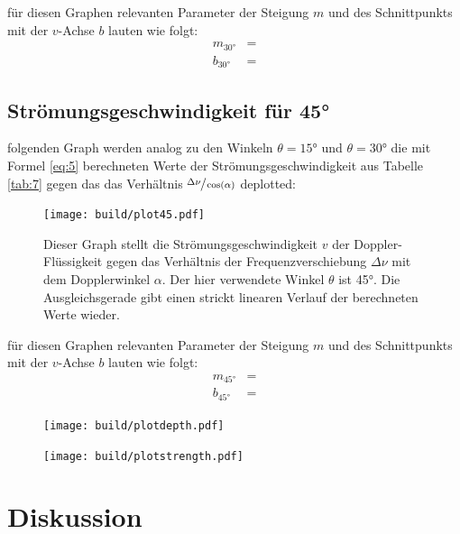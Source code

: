     \justifying für diesen Graphen relevanten Parameter der Steigung $m$ und des Schnittpunkts mit der $v$-Achse $b$ lauten wie folgt:
    \begin{align}
        m_{30°} &= \text{} \label{eq:8}\\
        b_{30°} &= \text{} \label{eq:9}
    \end{align}

\newpage
\subsection{Strömungsgeschwindigkeit für 45°}

    \justifying folgenden Graph werden analog zu den Winkeln $\theta=15°$ und $\theta=30°$ die mit Formel \eqref{eq:5} berechneten Werte der Strömungsgeschwindigkeit 
    aus Tabelle \ref{tab:7} gegen das das Verhältnis $\sfrac{\Delta\nu}{\cos(\alpha)}$ deplotted:

\begin{figure}[H]
    \centering
    \texttt{[image: build/plot45.pdf]}
    \caption{Dieser Graph stellt die Strömungsgeschwindigkeit $v$ der Doppler-Flüssigkeit gegen das Verhältnis der Frequenzverschiebung $\Delta\nu$ mit dem Dopplerwinkel $\alpha$. 
    Der hier verwendete Winkel $\theta$ ist 45°. Die Ausgleichsgerade gibt einen strickt linearen Verlauf der berechneten Werte wieder.}
    \label{fig:7}
\end{figure}

    \justifying für diesen Graphen relevanten Parameter der Steigung $m$ und des Schnittpunkts mit der $v$-Achse $b$ lauten wie folgt:
    \begin{align}
        m_{45°} &= \text{} \label{eq:10}\\
        b_{45°} &= \text{} \label{eq:11}
    \end{align}



\begin{figure}[H]
    \centering
    \texttt{[image: build/plotdepth.pdf]}
    \caption{}
    \label{fig:8}
\end{figure}

\begin{figure}[H]
    \centering
    \texttt{[image: build/plotstrength.pdf]}
    \caption{}
    \label{fig:9}
\end{figure}

\section{Diskussion}

